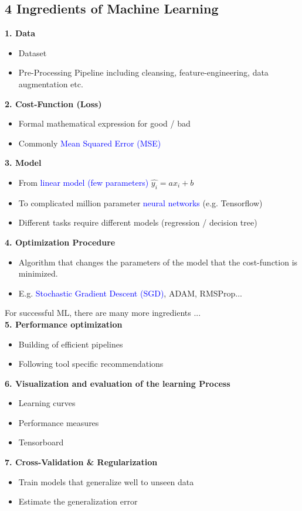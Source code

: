\subsection{4 Ingredients of Machine Learning}
\textbf{1. Data}
\begin{itemize}
    \item Dataset
    \item Pre-Processing Pipeline including cleansing, feature-engineering, data augmentation etc.
\end{itemize}
\vspace{10pt}
\textbf{2. Cost-Function (Loss)}
\begin{itemize}
    \item Formal mathematical expression for good / bad
    \item Commonly \textcolor{blue}{Mean Squared Error (MSE)}
\end{itemize}
\vspace{10pt}
\textbf{3. Model}
\begin{itemize}
    \item From \textcolor{blue}{linear model (few parameters)} $\hat{y_i} = ax_i + b$
    \item To complicated million parameter \textcolor{blue}{neural networks} (e.g. Tensorflow)
    \item Different tasks require different models (regression / decision tree)
\end{itemize}
\vspace{10pt}
\textbf{4. Optimization Procedure}
\begin{itemize}
    \item Algorithm that changes the parameters of the model that the cost-function is minimized.
    \item E.g. \textcolor{blue}{Stochastic Gradient Descent (SGD)}, ADAM, RMSProp...
\end{itemize}
\vspace{10pt}
For successful ML, there are many more ingredients ...\\
\textbf{5. Performance optimization}
\begin{itemize}
    \item Building of efficient pipelines
    \item Following tool specific recommendations
\end{itemize}
\vspace{10pt}
\textbf{6. Visualization and evaluation of the learning Process}
\begin{itemize}
    \item Learning curves
    \item Performance measures
    \item Tensorboard
\end{itemize}
\vspace{10pt}
\textbf{7. Cross-Validation \& Regularization}
\begin{itemize}
    \item Train models that generalize well to unseen data
    \item Estimate the generalization error
\end{itemize}


